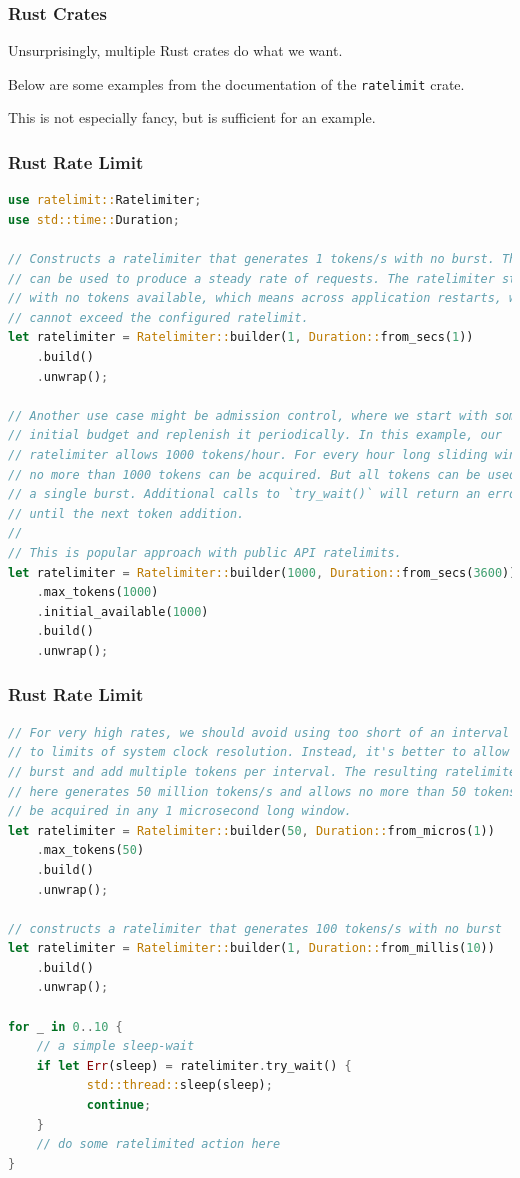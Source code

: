 \begin{frame}
\frametitle{Rust Crates}

Unsurprisingly, multiple Rust crates do what we want. 

Below are some examples from the documentation of the \texttt{ratelimit} crate.

This is not especially fancy, but is sufficient for an example.

\end{frame}

\begin{frame}[fragile]
\frametitle{Rust Rate Limit}
\begin{lstlisting}[language=Rust]
use ratelimit::Ratelimiter;
use std::time::Duration;

// Constructs a ratelimiter that generates 1 tokens/s with no burst. This
// can be used to produce a steady rate of requests. The ratelimiter starts
// with no tokens available, which means across application restarts, we
// cannot exceed the configured ratelimit.
let ratelimiter = Ratelimiter::builder(1, Duration::from_secs(1))
    .build()
    .unwrap();

// Another use case might be admission control, where we start with some
// initial budget and replenish it periodically. In this example, our
// ratelimiter allows 1000 tokens/hour. For every hour long sliding window,
// no more than 1000 tokens can be acquired. But all tokens can be used in
// a single burst. Additional calls to `try_wait()` will return an error
// until the next token addition.
//
// This is popular approach with public API ratelimits.
let ratelimiter = Ratelimiter::builder(1000, Duration::from_secs(3600))
    .max_tokens(1000)
    .initial_available(1000)
    .build()
    .unwrap();
\end{lstlisting}

\end{frame}

\begin{frame}[fragile]
\frametitle{Rust Rate Limit}
\begin{lstlisting}[language=Rust]
// For very high rates, we should avoid using too short of an interval due
// to limits of system clock resolution. Instead, it's better to allow some
// burst and add multiple tokens per interval. The resulting ratelimiter
// here generates 50 million tokens/s and allows no more than 50 tokens to
// be acquired in any 1 microsecond long window.
let ratelimiter = Ratelimiter::builder(50, Duration::from_micros(1))
    .max_tokens(50)
    .build()
    .unwrap();

// constructs a ratelimiter that generates 100 tokens/s with no burst
let ratelimiter = Ratelimiter::builder(1, Duration::from_millis(10))
    .build()
    .unwrap();

for _ in 0..10 {
    // a simple sleep-wait
    if let Err(sleep) = ratelimiter.try_wait() {
           std::thread::sleep(sleep);
           continue;
    }
    // do some ratelimited action here    
}
\end{lstlisting}
\end{frame}

